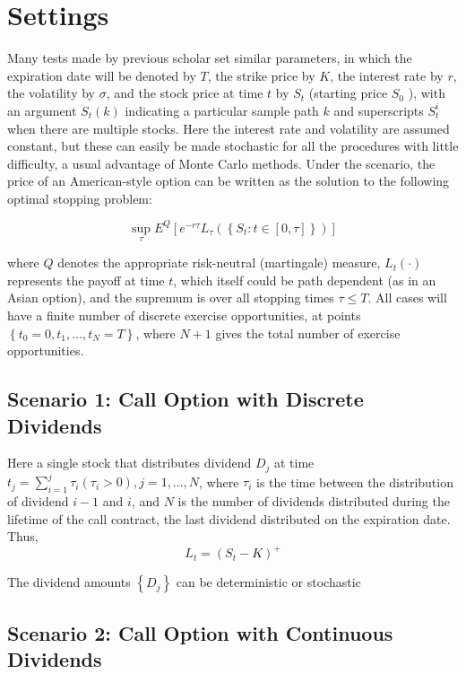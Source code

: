 \documentclass[margin=1in]{article}
\begin{document}
	\section*{Settings}
	
	Many tests made by previous scholar set similar parameters, in which the expiration date will be denoted by $T$, the strike price by $K$, the interest rate by $r$, the volatility by $\sigma$, and the stock price at time $t$ by $S_{t}$ (starting price $S_{0}$ ), with an argument $S_{t}(k)$ indicating a particular sample path $k$ and superscripts $S_{t}^{i}$ when there are multiple stocks. Here the interest rate and volatility are assumed constant, but these can easily be made stochastic for all the procedures with little difficulty, a usual advantage of Monte Carlo methods. Under the scenario, the price of an American-style option can be written as the solution to the following optimal stopping problem:
	
	$$
		\sup _{\tau} E^{Q}\left[e^{-r \tau} L_{\tau}\left(\left\{S_{t}: t \in[0, \tau]\right\}\right)\right]
	$$
	
	where $Q$ denotes the appropriate risk-neutral (martingale) measure, $L_{t}(\cdot)$ represents the payoff at time $t$, which itself could be path dependent (as in an Asian option), and the supremum is over all stopping times $\tau \leq T$. All cases will have a finite number of discrete exercise opportunities, at points $\left\{t_{0}=0, t_{1}, \ldots, t_{N}=T\right\}$, where $N+1$ gives the total number of exercise opportunities.
	
	\subsection*{Scenario 1: Call Option with Discrete Dividends}
	Here a single stock that distributes dividend $D_{j}$ at time $t_{j}=\sum_{i=1}^{j} \tau_{i}\left(\tau_{i}>0\right), j=1, \ldots, N$, where $\tau_{i}$ is the time between the distribution of dividend $i-1$ and $i$, and $N$ is the number of dividends distributed during the lifetime of the call contract, the last dividend distributed on the expiration date. Thus,
	$$
		L_{t}=\left(S_{t}-K\right)^{+}
	$$
	
	The dividend amounts $\left\{D_{j}\right\}$ can be deterministic or stochastic
	
	\subsection*{Scenario 2: Call Option with Continuous Dividends}
	 
\end{document}
